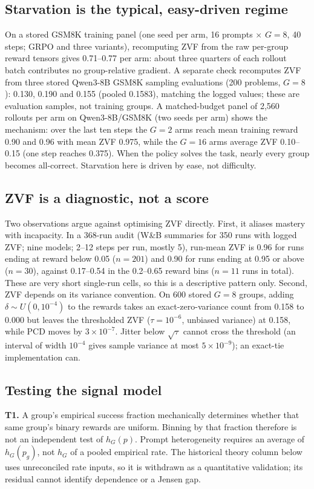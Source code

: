\subsection{Starvation is the typical, easy-driven regime}
On a stored GSM8K training panel (one seed per arm, 16 prompts $\times$
$G=8$, 40 steps; GRPO and three variants), recomputing ZVF from the raw
per-group reward tensors gives 0.71--0.77 per arm: about three quarters of
each rollout batch contributes no group-relative gradient. A separate check
recomputes ZVF from three stored Qwen3-8B GSM8K sampling evaluations
(200 problems, $G=8$): 0.130, 0.190 and 0.155 (pooled 0.1583), matching the
logged values; these are evaluation samples, not training groups. A
matched-budget panel of 2,560 rollouts per arm on Qwen3-8B/GSM8K (two seeds
per arm) shows the mechanism: over the last ten steps the $G=2$ arms reach
mean training reward 0.90 and 0.96 with mean ZVF 0.975, while the $G=16$ arms
average ZVF 0.10--0.15 (one step reaches 0.375). When the policy solves the task, nearly every
group becomes all-correct. Starvation here is driven by ease, not
difficulty.

\subsection{ZVF is a diagnostic, not a score}
Two observations argue against optimising ZVF directly. First, it aliases
mastery with incapacity. In a 368-run audit (W\&B summaries for 350 runs
with logged ZVF; nine models; 2--12 steps per run, mostly 5), run-mean ZVF is
0.96 for runs ending at reward below 0.05 ($n=201$) and 0.90 for runs ending
at 0.95 or above ($n=30$), against 0.17--0.54 in the 0.2--0.65 reward bins
($n=11$ runs in total). These are very short single-run cells, so this is a
descriptive pattern only. Second, ZVF depends on its variance convention. On
600 stored $G=8$ groups, adding $\delta\sim U(0,10^{-4})$ to the rewards
takes an exact-zero-variance count from 0.158 to 0.000 but leaves the
thresholded ZVF ($\tau=10^{-6}$, unbiased variance) at 0.158, while PCD
moves by $3\times10^{-7}$. Jitter below $\sqrt{\tau}$ cannot cross the
threshold (an interval of width $10^{-4}$ gives sample variance at most
$5\times10^{-9}$); an exact-tie implementation can.

\subsection{Testing the signal model}
\textbf{T1.} A group's empirical success fraction mechanically determines
whether that same group's binary rewards are uniform. Binning by that fraction
therefore is not an independent test of $h_G(p)$. Prompt heterogeneity requires
an average of $h_G(p_g)$, not $h_G$ of a pooled empirical rate. The historical
theory column below uses unreconciled rate inputs, so it is withdrawn as a
quantitative validation; its residual cannot identify dependence or a Jensen gap.

